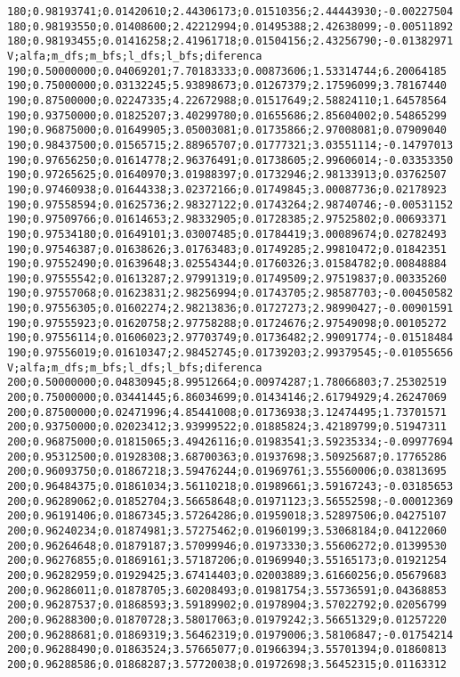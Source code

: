 \documentclass[brazil,times]{abnt}
\begin{document}
{\begin{verbatim}
180;0.98193741;0.01420610;2.44306173;0.01510356;2.44443930;-0.00227504
180;0.98193550;0.01408600;2.42212994;0.01495388;2.42638099;-0.00511892
180;0.98193455;0.01416258;2.41961718;0.01504156;2.43256790;-0.01382971
V;alfa;m_dfs;m_bfs;l_dfs;l_bfs;diferenca
190;0.50000000;0.04069201;7.70183333;0.00873606;1.53314744;6.20064185
190;0.75000000;0.03132245;5.93898673;0.01267379;2.17596099;3.78167440
190;0.87500000;0.02247335;4.22672988;0.01517649;2.58824110;1.64578564
190;0.93750000;0.01825207;3.40299780;0.01655686;2.85604002;0.54865299
190;0.96875000;0.01649905;3.05003081;0.01735866;2.97008081;0.07909040
190;0.98437500;0.01565715;2.88965707;0.01777321;3.03551114;-0.14797013
190;0.97656250;0.01614778;2.96376491;0.01738605;2.99606014;-0.03353350
190;0.97265625;0.01640970;3.01988397;0.01732946;2.98133913;0.03762507
190;0.97460938;0.01644338;3.02372166;0.01749845;3.00087736;0.02178923
190;0.97558594;0.01625736;2.98327122;0.01743264;2.98740746;-0.00531152
190;0.97509766;0.01614653;2.98332905;0.01728385;2.97525802;0.00693371
190;0.97534180;0.01649101;3.03007485;0.01784419;3.00089674;0.02782493
190;0.97546387;0.01638626;3.01763483;0.01749285;2.99810472;0.01842351
190;0.97552490;0.01639648;3.02554344;0.01760326;3.01584782;0.00848884
190;0.97555542;0.01613287;2.97991319;0.01749509;2.97519837;0.00335260
190;0.97557068;0.01623831;2.98256994;0.01743705;2.98587703;-0.00450582
190;0.97556305;0.01602274;2.98213836;0.01727273;2.98990427;-0.00901591
190;0.97555923;0.01620758;2.97758288;0.01724676;2.97549098;0.00105272
190;0.97556114;0.01606023;2.97703749;0.01736482;2.99091774;-0.01518484
190;0.97556019;0.01610347;2.98452745;0.01739203;2.99379545;-0.01055656
V;alfa;m_dfs;m_bfs;l_dfs;l_bfs;diferenca
200;0.50000000;0.04830945;8.99512664;0.00974287;1.78066803;7.25302519
200;0.75000000;0.03441445;6.86034699;0.01434146;2.61794929;4.26247069
200;0.87500000;0.02471996;4.85441008;0.01736938;3.12474495;1.73701571
200;0.93750000;0.02023412;3.93999522;0.01885824;3.42189799;0.51947311
200;0.96875000;0.01815065;3.49426116;0.01983541;3.59235334;-0.09977694
200;0.95312500;0.01928308;3.68700363;0.01937698;3.50925687;0.17765286
200;0.96093750;0.01867218;3.59476244;0.01969761;3.55560006;0.03813695
200;0.96484375;0.01861034;3.56110218;0.01989661;3.59167243;-0.03185653
200;0.96289062;0.01852704;3.56658648;0.01971123;3.56552598;-0.00012369
200;0.96191406;0.01867345;3.57264286;0.01959018;3.52897506;0.04275107
200;0.96240234;0.01874981;3.57275462;0.01960199;3.53068184;0.04122060
200;0.96264648;0.01879187;3.57099946;0.01973330;3.55606272;0.01399530
200;0.96276855;0.01869161;3.57187206;0.01969940;3.55165173;0.01921254
200;0.96282959;0.01929425;3.67414403;0.02003889;3.61660256;0.05679683
200;0.96286011;0.01878705;3.60208493;0.01981754;3.55736591;0.04368853
200;0.96287537;0.01868593;3.59189902;0.01978904;3.57022792;0.02056799
200;0.96288300;0.01870728;3.58017063;0.01979242;3.56651329;0.01257220
200;0.96288681;0.01869319;3.56462319;0.01979006;3.58106847;-0.01754214
200;0.96288490;0.01863524;3.57665077;0.01966394;3.55701394;0.01860813
200;0.96288586;0.01868287;3.57720038;0.01972698;3.56452315;0.01163312
\end{verbatim} }
\end{document}
